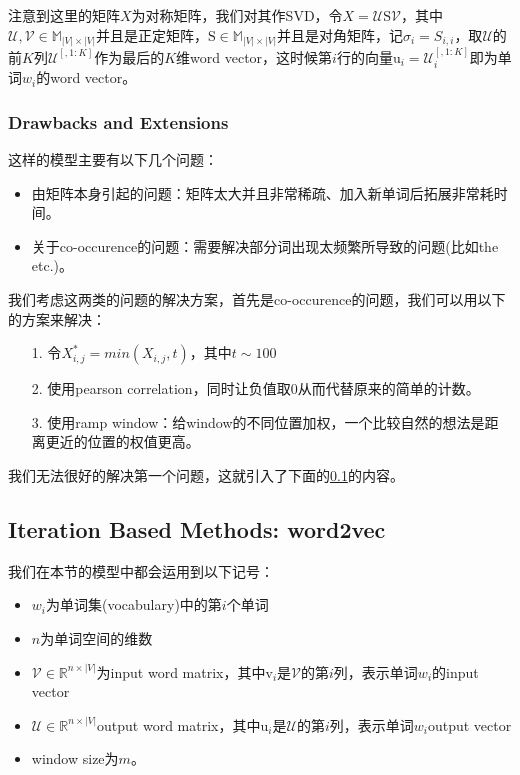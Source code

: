 \documentclass{article}
\begin{document}
注意到这里的矩阵$X$为对称矩阵，我们对其作SVD，令$X=\mathcal{U}\mathrm{S}\mathcal{V}$，其中$\mathcal{U},\mathcal{V} \in \mathbb{M}_{\lvert V\rvert\times \lvert V\rvert}$并且是正定矩阵，$\mathrm{S} \in \mathbb{M}_{\lvert V\rvert\times\lvert V\rvert}$并且是对角矩阵，记$\sigma_i=S_{i,i}$，取$\mathcal{U}$的前$K$列$\mathcal{U}^{[,1:K]}$作为最后的$K$维word vector，这时候第$i$行的向量$\mathrm{u}_i=\mathcal{U}^{[,1:K]}_i$即为单词$w_i$的word vector。

\subsubsection*{Drawbacks and Extensions}

这样的模型主要有以下几个问题：

\begin{itemize}
	\item 由矩阵本身引起的问题：矩阵太大并且非常稀疏、加入新单词后拓展非常耗时间。
	\item 关于co-occurence的问题：需要解决部分词出现太频繁所导致的问题(比如the etc.)。
\end{itemize}

我们考虑这两类的问题的解决方案，首先是co-occurence的问题，我们可以用以下的方案来解决：

\begin{itemize}
	\item [1.] 令$X^*_{i,j}=min(X_{i,j}, t)$，其中$t \sim 100$
	\item [2.] 使用pearson correlation，同时让负值取0从而代替原来的简单的计数。
	\item [3.] 使用ramp window：给window的不同位置加权，一个比较自然的想法是距离更近的位置的权值更高。
\end{itemize}

我们无法很好的解决第一个问题，这就引入了下面的\ref{word2vec}的内容。

\subsection{Iteration Based Methods: word2vec}
\label{word2vec}

我们在本节的模型中都会运用到以下记号：

\begin{itemize}
	\item $w_i$为单词集(vocabulary)中的第$i$个单词
	\item $n$为单词空间的维数
	\item $\mathcal{V}\in\mathbb{R}^{n\times\lvert V\rvert}$为input word matrix，其中$\mathrm{v}_i$是$\mathcal{V}$的第$i$列，表示单词$w_i$的input vector
	\item $\mathcal{U}\in\mathbb{R}^{n\times\lvert V\rvert}$output word matrix，其中$\mathrm{u}_i$是$\mathcal{U}$的第$i$列，表示单词$w_i$output vector
	\item window size为$m$。
\end{itemize}
\end{document}
